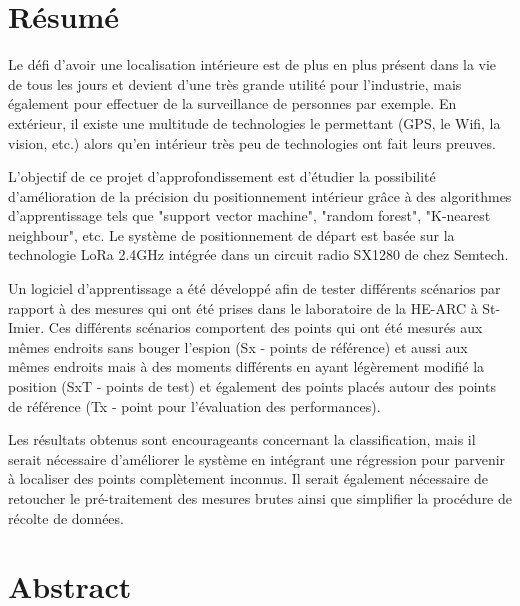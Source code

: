 \chapter*{Résumé}
Le défi d'avoir une localisation intérieure est de plus en plus présent dans la vie de tous les jours et devient d'une très grande utilité pour l'industrie, mais également pour effectuer de la surveillance de personnes par exemple. En extérieur, il existe une multitude de technologies le permettant (GPS, le Wifi, la vision, etc.) alors qu'en intérieur très peu de technologies ont fait leurs preuves.

L'objectif de ce projet d'approfondissement est d'étudier la possibilité d'amélioration de la précision du positionnement intérieur grâce à des algorithmes d'apprentissage tels que "support vector machine", "random forest", "K-nearest neighbour", etc. Le système de positionnement de départ est basée sur la technologie LoRa 2.4GHz intégrée dans un circuit radio SX1280 de chez Semtech. 

Un logiciel d'apprentissage a été développé afin de tester différents scénarios par rapport à des mesures qui ont été prises dans le laboratoire de la HE-ARC à St-Imier. Ces différents scénarios comportent des points qui ont été mesurés aux mêmes endroits sans bouger l'espion (Sx - points de référence) et aussi aux mêmes endroits mais à des moments différents en ayant légèrement modifié la position (SxT - points de test) et également des points placés autour des points de référence (Tx - point pour l'évaluation des performances).

Les résultats obtenus sont encourageants concernant la classification, mais il serait nécessaire d'améliorer le système en intégrant une régression pour parvenir à localiser des points complètement inconnus. Il serait également nécessaire de retoucher le pré-traitement des mesures brutes ainsi que simplifier la procédure de récolte de données.
  

{\let\clearpage\relax\par \chapter*{Abstract}}

